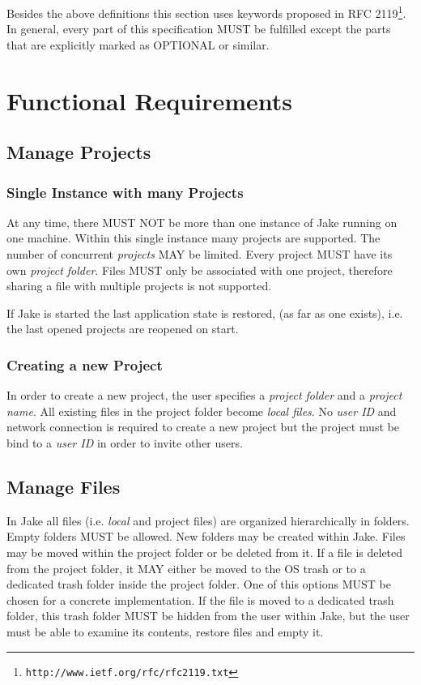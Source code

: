 Besides the above definitions this section uses keywords proposed in RFC 2119\footnote{\texttt{http://www.ietf.org/rfc/rfc2119.txt}}. In general, every part of this specification MUST be fulfilled except the parts that are explicitly marked as OPTIONAL or similar.

\section{Functional Requirements}

\subsection{Manage Projects}
\subsubsection{Single Instance with many Projects}
At any time, there MUST NOT be more than one instance of Jake running on one machine. Within this single instance many projects are supported. The number of concurrent \emph{projects} MAY be limited. Every project MUST have its own \emph{project folder}. Files MUST only be associated with one project, therefore sharing a  file with multiple projects is not supported.

If Jake is started the last application state is restored, (as far as one exists), i.e. the last opened projects are reopened on start. 

\subsubsection{Creating a new Project}
In order to create a new project, the user specifies a \emph{project folder} and a \emph{project name}. All existing files in the project folder become \emph{local files}. No \emph{user ID} and network connection is required to create a new project but the project must be bind to a \emph{user ID} in order to invite other users.

\subsection{Manage Files}
In Jake all files (i.e. \emph{local} and {project files}) are organized hierarchically in folders. Empty folders MUST be allowed. New folders may be created within Jake. Files may be moved within the project folder or be deleted from it. If a file is deleted from the project folder, it MAY either be moved to the OS trash or to a dedicated trash folder inside the project folder. One of this options MUST be chosen for a concrete implementation. If the file is moved to a dedicated trash folder, this trash folder MUST be hidden from the user within Jake, but the user must be able to examine its contents, restore files and empty it.

